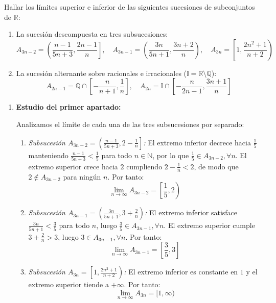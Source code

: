 \begin{problema}
Hallar los límites superior e inferior de las siguientes sucesiones de subconjuntos de $\mathbb{R}$:
\begin{enumerate}[label=\alph*)]
    \item La sucesión descompuesta en tres subsucesiones:
    \[
        A_{3n-2} = \left(\frac{n-1}{5n+3}, \frac{2n-1}{n}\right], \quad A_{3n-1} = \left(\frac{3n}{5n+1}, \frac{3n+2}{n}\right), \quad A_{3n} = \left[1, \frac{2n^2+1}{n+2}\right)
    \]
    \item La sucesión alternante sobre racionales e irracionales ($\mathbb{I} = \mathbb{R} \setminus \mathbb{Q}$):
    \[
        A_{2n-1} = \mathbb{Q} \cap \left[-\frac{n}{n+1}, \frac{1}{n}\right], \quad A_{2n} = \mathbb{I} \cap \left[-\frac{n}{2n-1}, \frac{3n+1}{n}\right]
    \]
\end{enumerate}

\tcblower

\begin{enumerate}[label=\alph*)]
    \item \textbf{Estudio del primer apartado:}
    
    Analizamos el límite de cada una de las tres subsucesiones por separado:
    \begin{enumerate}[label=\arabic*.]
        \item \textit{Subsucesión $A_{3n-2} = \left(\frac{n-1}{5n+3}, 2 - \frac{1}{n}\right]$:}
        El extremo inferior decrece hacia $\frac{1}{5}$ manteniendo $\frac{n-1}{5n+3} < \frac{1}{5}$ para todo $n \in \mathbb{N}$, por lo que $\frac{1}{5} \in A_{3n-2}, \forall n$. El extremo superior crece hacia $2$ cumpliendo $2 - \frac{1}{n} < 2$, de modo que $2 \notin A_{3n-2}$ para ningún $n$. Por tanto:
        \[
            \lim_{n \to \infty} A_{3n-2} = \left[\frac{1}{5}, 2\right)
        \]

        \item \textit{Subsucesión $A_{3n-1} = \left(\frac{3n}{5n+1}, 3 + \frac{2}{n}\right)$:}
        El extremo inferior satisface $\frac{3n}{5n+1} < \frac{3}{5}$ para todo $n$, luego $\frac{3}{5} \in A_{3n-1}, \forall n$. El extremo superior cumple $3 + \frac{2}{n} > 3$, luego $3 \in A_{3n-1}, \forall n$. Por tanto:
        \[
            \lim_{n \to \infty} A_{3n-1} = \left[\frac{3}{5}, 3\right]
        \]

        \item \textit{Subsucesión $A_{3n} = \left[1, \frac{2n^2+1}{n+2}\right)$:}
        El extremo inferior es constante en $1$ y el extremo superior tiende a $+\infty$. Por tanto:
        \[
            \lim_{n \to \infty} A_{3n} = [1, \infty)
        \]
    \end{enumerate}


\end{enumerate}
\end{problema}
